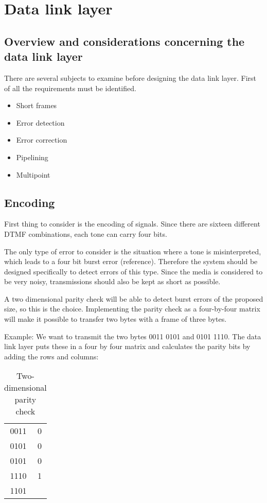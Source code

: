 \section{Data link layer}\label{sec:dll_theory}
\subsection{Overview and considerations concerning the data link layer}
There are several subjects to examine before designing the data link layer.
First of all the requirements must be identified. 
\begin{itemize}
	\item 	Short frames
	\item	Error detection
	\item	Error correction
	\item	Pipelining
	\item 	Multipoint
\end{itemize}

\subsection{Encoding}
First thing to consider is the encoding of signals. Since there are sixteen
different DTMF combinations, each tone can carry four bits.

The only type of error to consider is the situation where a tone is
misinterpreted, which leads to a four bit burst error (reference). Therefore the
system should be designed specifically to detect errors of this type. Since the media
is considered to be very noisy, transmissions should also be kept as short as
possible.

A two dimensional parity check will be able to detect burst errors of the
proposed size, so this is the choice. Implementing the parity check as a
four-by-four matrix will make it possible to transfer two bytes with a frame of
three bytes.

Example: We want to transmit the two bytes 0011 0101 and 0101 1110. The data
link layer puts these in a four by four matrix and calculates the parity bits by
adding the rows and columns:

\begin{table}[htb]
	\begin{center}
	\begin{tabular}{c|c}
	0011 & 0 \\
	0101 & 0 \\
	0101 & 0 \\
	1110 & 1 \\
	\hline
	1101 & \\
	\end{tabular}
	\end{center}
	\caption{Two-dimensional parity check}
	\label{tab:two_dimensional_parity_check}
\end{table}

